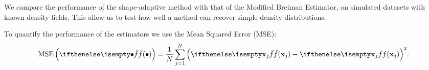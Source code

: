 We compare the performance of the shape-adaptive method with that of the Modified Breiman Estimator, on simulated datasets with known density fields. This allow us to test how well a method can recover simple density distributions. 

To quantify the performance of the estimators we use the Mean Squared Error (MSE):
\begin{equation*}
	\varMSE{\varEstimatedDensityFunction{\bullet}} = \frac{1}{\varNumPatterns} \sum_{\itXs = 1}^{\varNumPatterns} {\left(\varEstimatedDensityFunction{\varPattern[\itXs]} - \varDensityFunction{\varPattern[\itXs]} \right)}^2.
\end{equation*}


